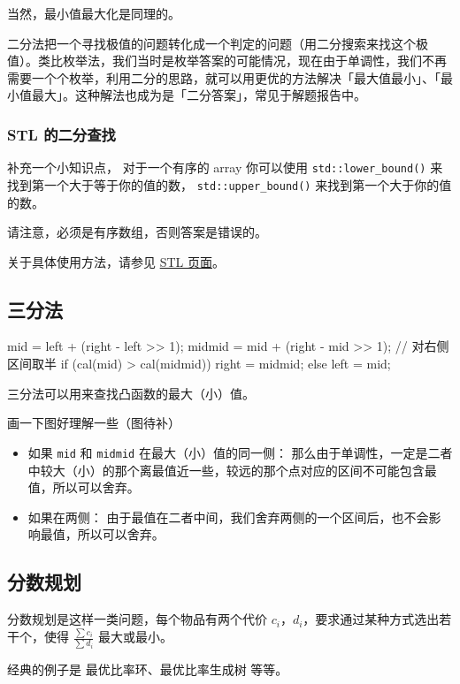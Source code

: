 当然，最小值最大化是同理的。

二分法把一个寻找极值的问题转化成一个判定的问题（用二分搜索来找这个极值）。类比枚举法，我们当时是枚举答案的可能情况，现在由于单调性，我们不再需要一个个枚举，利用二分的思路，就可以用更优的方法解决「最大值最小」、「最小值最大」。这种解法也成为是「二分答案」，常见于解题报告中。

\subsubsection{STL 的二分查找}

补充一个小知识点， 对于一个有序的 array 你可以使用 \texttt{std::lower_bound()} 来找到第一个大于等于你的值的数， \texttt{std::upper_bound()} 来找到第一个大于你的值的数。

请注意，必须是有序数组，否则答案是错误的。

关于具体使用方法，请参见 \href{/ds/stl/}{STL 页面}。

\subsection{三分法}

\begin{cppcode}
mid = left + (right - left >> 1);
midmid = mid + (right - mid >> 1);  // 对右侧区间取半
if (cal(mid) > cal(midmid))
  right = midmid;
else
  left = mid;
\end{cppcode}

三分法可以用来查找凸函数的最大（小）值。

画一下图好理解一些（图待补）

\begin{itemize}
\item 如果 \texttt{mid} 和 \texttt{midmid} 在最大（小）值的同一侧：
那么由于单调性，一定是二者中较大（小）的那个离最值近一些，较远的那个点对应的区间不可能包含最值，所以可以舍弃。
\item 如果在两侧：
由于最值在二者中间，我们舍弃两侧的一个区间后，也不会影响最值，所以可以舍弃。
\end{itemize}

\subsection{分数规划}

分数规划是这样一类问题，每个物品有两个代价 $c_i$，$d_i$，要求通过某种方式选出若干个，使得 $\frac{\sum{c_i}}{\sum{d_i}}$ 最大或最小。

经典的例子是 最优比率环、最优比率生成树 等等。

